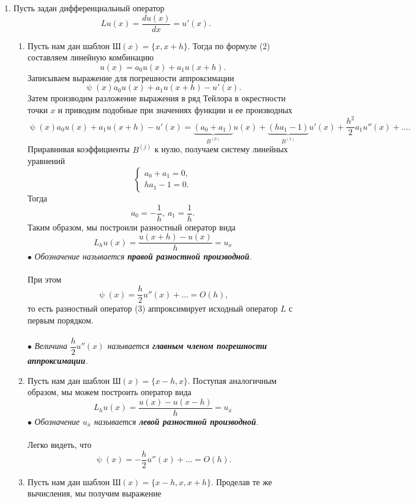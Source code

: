 \documentclass[a4paper, 12pt]{report}
\numberwithin{equation}{section}
\newcommand{\ol}{\overline}
\renewcommand{\psi}{\uppsi}
\begin{document}
	\begin{enumerate}
		\item Пусть задан дифференциальный оператор $$Lu(x) = \dfrac{d u(x)}{dx} = u'(x).$$
		\begin{enumerate}
			\item Пусть нам дан шаблон $\text{Ш}(x) = \{x, x+h\}$. Тогда по формуле (2) составляем линейную комбинацию
			$$u(x) = a_0 u(x) + a_1u(x+h).$$
			Записываем выражение для погрешности аппроксимации
			$$\psi(x) a_0u(x) + a_1u(x+h) - u'(x).$$
			Затем производим разложение выражения в ряд Тейлора в окрестности точки $x$ и приводим подобные при значениях функции и ее производных
			$$\psi(x) a_0u(x) + a_1u(x+h) - u'(x) = \underbrace{(a_0+a_1)}_{B ^{(0)}}u(x) + \underbrace{(ha_1 - 1)}_{B^{(1)}} u'(x) + \dfrac{h^2}{2} a_1 u''(x) + \ldots.$$
			Приравнивая коэффициенты $B^{(j)}$ к нулю, получаем систему линейных уравнений 
			$$\begin{cases}
				a_0+a_1 = 0,\\
				ha_1 - 1= 0.
			\end{cases}$$
			Тогда $$a_0 = -\dfrac 1h,\ a_1 = \dfrac 1h.$$
			Таким образом, мы построили разностный оператор вида 
			\begin{equation}
				L_hu(x) = \dfrac{u(x+h) - u(x)}{h} = u_x
			\end{equation}
			$\bullet$ \textit{Обозначение называется \textbf{правой разностной производной}.}\\\\
			При этом $$\psi(x) = \dfrac h2 u''(x) + \ldots = O(h),$$ то есть разностный оператор (3) аппроксимирует исходный оператор $L$ с первым порядком.\\\\
			$\bullet$ \textit{Величина $\dfrac h 2 u''(x)$ называется \textbf{главным членом погрешности аппроксимации}.}
			\item Пусть нам дан шаблон $\text{Ш}(x) = \{x-h, x\}$. Поступая аналогичным образом, мы можем построить оператор вида 
			\begin{equation}
				L_hu(x) = \dfrac{u(x) - u(x-h)}{h} = u_{\ol x}
			\end{equation}
			$\bullet$ \textit{Обозначение $u_{\ol x}$ называется \textbf{левой разностной производной}. }
			\\\\
			Легко видеть, что $$\psi(x) = -\dfrac h2 u''(x) + \ldots = O(h).$$ 
			\item Пусть нам дан шаблон $\text{Ш}(x) = \{x-h, x, x+h\}$. Проделав те же вычисления, мы получим выражение 

\end{enumerate}
\end{enumerate}
\end{document}
